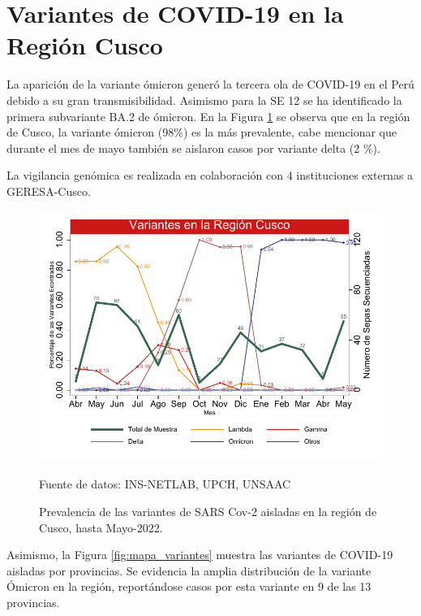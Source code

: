 \documentclass[12pt,a4paper,openany]{book}
\begin{document}
	\section* {Variantes de COVID-19 en la Región Cusco}
	\noindent La aparición de la variante ómicron generó la tercera ola de COVID-19 en el Perú debido a su gran transmisibilidad. Asimismo para la SE 12 se ha identificado la primera subvariante BA.2 de ómicron. En la Figura \ref{fig:variantes} se observa que en la región de Cusco, la variante ómicron (98$\%$) es la más prevalente, cabe mencionar que durante el mes de mayo también se aislaron casos por variante delta (2 $\%$).  
	 
	La vigilancia genómica es realizada en colaboración con 4 instituciones externas a GERESA-Cusco.
	
	\begin{figure}[h]
		\caption{Prevalencia de las variantes de SARS Cov-2 aisladas en la región de Cusco, hasta Mayo-2022. }\label{fig:variantes}
		\begin{center}
			\includegraphics[width=0.85\linewidth]{../figuras/variantes.pdf}
		\end{center}
		{\footnotesize {Fuente de datos: INS-NETLAB, UPCH, UNSAAC}}
	\end{figure}
	
	Asimismo, la Figura \ref{fig:mapa_variantes} muestra las variantes de COVID-19 aisladas por provincias. Se evidencia la amplia distribución de la variante Ómicron en la región, reportándose casos por esta variante en 9 de las 13 provincias. 
	
\end{document}
